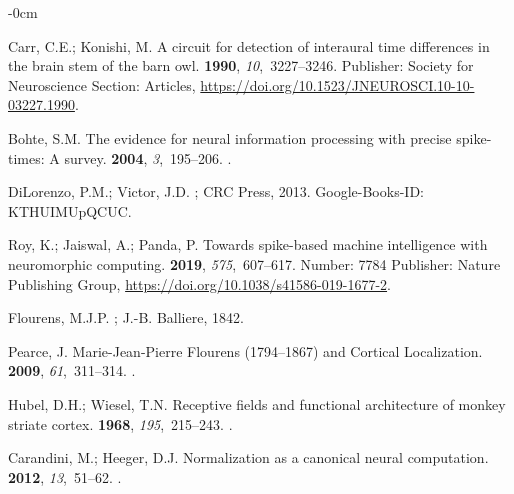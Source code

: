 \documentclass[brainsci, %
               review,submit,pdftex,moreauthors
               ]{Definitions/mdpi}
\begin{document}
\begin{adjustwidth}{-\extralength}{0cm}
\begin{thebibliography}{999}
  Carr, C.E.; Konishi, M.
  \newblock A circuit for detection of interaural time differences in the brain
    stem of the barn owl.
   {\bf 1990}, {\em 10},~3227--3246.
  \newblock Publisher: Society for Neuroscience Section: Articles,
    {\url{https://doi.org/10.1523/JNEUROSCI.10-10-03227.1990}}.
  
  Bohte, S.M.
  \newblock The evidence for neural information processing with precise
    spike-times: {A} survey.
   {\bf 2004}, {\em 3},~195--206.
  .
  
  DiLorenzo, P.M.; Victor, J.D.
  ; CRC Press,  2013.
  \newblock Google-Books-ID: KTHUIMUpQCUC.
  
  Roy, K.; Jaiswal, A.; Panda, P.
  \newblock Towards spike-based machine intelligence with neuromorphic computing.
   {\bf 2019}, {\em 575},~607--617.
  \newblock Number: 7784 Publisher: Nature Publishing Group,
    {\url{https://doi.org/10.1038/s41586-019-1677-2}}.
  
  Flourens, M.J.P.
  ; J.-B. Balliere,  1842.
  
  Pearce, J.
  \newblock Marie-{Jean}-{Pierre} {Flourens} (1794–1867) and {Cortical}
    {Localization}.
   {\bf 2009}, {\em 61},~311--314.
  .
  
  Hubel, D.H.; Wiesel, T.N.
  \newblock Receptive fields and functional architecture of monkey striate
    cortex.
   {\bf 1968}, {\em 195},~215--243.
  .
  
  Carandini, M.; Heeger, D.J.
  \newblock Normalization as a canonical neural computation.
   {\bf 2012}, {\em 13},~51--62.
  .
  

\end{thebibliography}
\end{adjustwidth}
\end{document}
